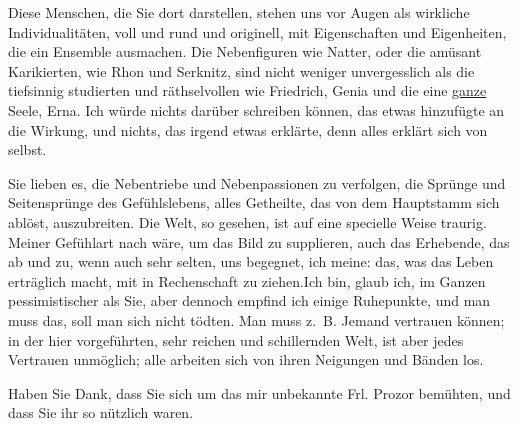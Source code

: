 \pstart
           Diese Menschen, die Sie dort darstellen, stehen uns vor Augen als wirkliche
               Individualitäten, voll und rund und originell, mit Eigenschaften und Eigenheiten, die
               ein Ensemble ausmachen. Die Nebenfiguren wie Natter, oder die amüsant Karikierten, wie Rhon und Serknitz, sind nicht weniger unvergesslich als die
               tiefsinnig studierten und räthselvollen wie Friedrich, Genia und die eine \uline{ganze}
               Seele, Erna. {\pb}Ich würde nichts darüber schreiben
               können, das etwas hinzufügte an die Wirkung, und nichts, das irgend etwas erklärte,
               denn alles erklärt sich von selbst.\pend
           
\pstart
           Sie lieben es, die Nebentriebe und Nebenpassionen zu verfolgen, die Sprünge und
               Seitensprünge des Gefühlslebens, alles Getheilte, das von dem Hauptstamm sich ablöst,
               auszubreiten. Die Welt, so gesehen, ist auf eine specielle Weise traurig. Meiner
               Gefühlart nach wäre, um das Bild zu supplieren, auch das Erhebende, das ab und zu,
               wenn auch sehr selten, uns begegnet, ich meine: das, was das Leben erträglich macht,
                   mit in Rechenschaft zu ziehen.\hspace*{2em}Ich bin, glaub ich, im Ganzen pessimistischer als Sie,
               aber dennoch empfind ich einige Ruhepunkte, und man muss das, soll man sich nicht
               tödten. Man muss z. B. Jemand vertrauen können; {\pb}in der hier vorgeführten, sehr
               reichen und schillernden Welt, ist aber jedes Vertrauen unmöglich; alle arbeiten sich
               von ihren Neigungen und Bänden los.\pend
           
\pstart
           Haben Sie Dank, dass Sie sich um das mir unbekannte Frl. Prozor bemühten, und dass Sie ihr so nützlich waren.\pend
           
